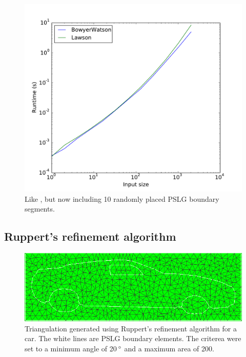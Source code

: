 \begin{figure}
    \centering
    \includegraphics[width=\columnwidth]{../images/runtime_segments.pdf}
    \caption{Like , but now including 10 randomly placed PSLG boundary segments.}
    \label{fig:result_runtimeSegments}
\end{figure}


\subsection{Ruppert's refinement algorithm}



\begin{figure}
    \centering
    \includegraphics[width=\columnwidth]{../images/Car_Ruppert20.png}
    \caption{Triangulation generated using Ruppert's refinement algorithm for a car. The white lines are PSLG boundary elements.
    The criterea were set to a minimum angle of 20$\,^{\circ}$ and a maximum area of 200.}
    \label{fig:result_Car20}
\end{figure}

